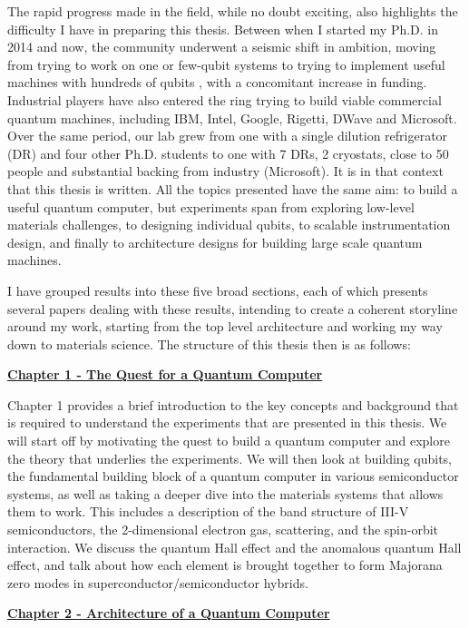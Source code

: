 The rapid progress made in the field, while no doubt exciting, also highlights the difficulty I have in
preparing this thesis. Between when I started my Ph.D. in 2014 and now, the community underwent a seismic
shift in ambition, moving from trying to work on one or few-qubit systems \cite{iarpa_mqco} to trying
to implement useful machines with hundreds of qubits \cite{Monroe440}, with a concomitant increase in
funding. Industrial players have also
entered the ring trying to build viable commercial quantum machines, including IBM, Intel, Google, Rigetti,
DWave and Microsoft. Over the same period, our lab grew from one with a single dilution refrigerator (DR) and
four other Ph.D. students to one with 7 DRs, 2 cryostats, close to 50 people and substantial backing
from industry (Microsoft). It is in that context that this thesis is written. All the topics presented have the
same aim: to build a useful quantum computer, but experiments span from exploring low-level materials challenges,
to designing individual qubits, to scalable instrumentation design, and finally to architecture
designs for building large scale quantum machines.

I have grouped results into these five broad sections, each of which presents several papers dealing
with these results, intending to create a coherent storyline around my work, starting from the top
level architecture and working my way down to materials science. The structure of this thesis then is as follows:

\medskip
\noindent\textbf{\hyperref[sec:quest]{Chapter 1 - The Quest for a Quantum Computer}}

\noindent
Chapter 1 provides a brief introduction to the key concepts and background that is required to understand
the experiments that are presented in this thesis. We will start off by motivating the quest to build a quantum
computer and explore the theory that underlies the experiments. We will then look at building qubits,
the fundamental building block of a quantum computer in various semiconductor systems, as well as taking a
deeper dive into the materials systems that allows them to work. This includes a description of the band structure
of III-V semiconductors, the 2-dimensional electron gas, scattering, and the spin-orbit interaction. We discuss
the quantum Hall effect and the anomalous quantum Hall effect, and talk about how each element is brought together
to form Majorana zero modes in superconductor/semiconductor hybrids.

\newpage
\noindent\textbf{\hyperref[sec:arch]{Chapter 2 - Architecture of a Quantum Computer}}

